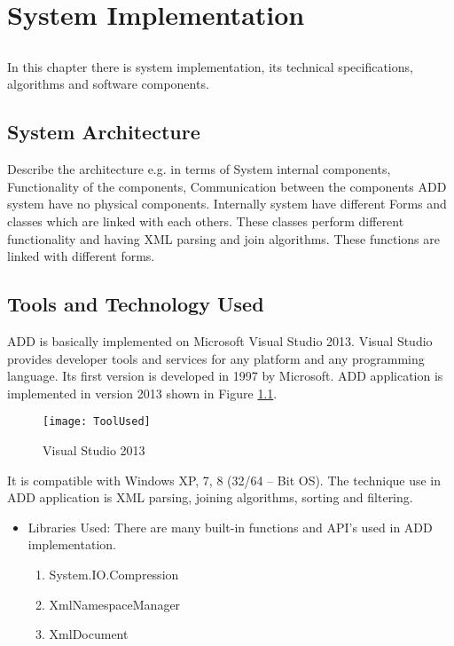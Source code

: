 \chapter{System Implementation} \label{chap:sysImplementation}

\section*{}
In this chapter there is system implementation, its technical specifications, algorithms and software components.

\section{System Architecture}
Describe the architecture e.g. in terms of System internal components, Functionality of the components, Communication between the components
ADD system have no physical components. Internally system have different Forms and classes which are linked with each others. These classes perform different functionality and having  XML parsing and join algorithms. These functions are linked with different forms.

\section{Tools and Technology Used}
ADD is basically implemented on Microsoft Visual Studio 2013. Visual Studio provides developer tools and services for any platform and any programming language. Its first version is developed in 1997 by Microsoft. ADD application is implemented in version 2013 shown in Figure \ref{fig:Visual Studio 2013}. 
\begin{figure}[ht]
\centering
\texttt{[image: ToolUsed]}
\caption{Visual Studio 2013}
\label{fig:Visual Studio 2013}
\end{figure} 
It is compatible with Windows XP, 7, 8 (32/64 – Bit OS). The technique use in ADD application is XML parsing, joining algorithms, sorting and filtering.
\begin{itemize}
	\item Libraries Used: There are many built-in functions and API's used in ADD implementation.
	
	\begin{enumerate}
		\item System.IO.Compression
		\item XmlNamespaceManager
		\item XmlDocument 
	\end{enumerate}
\end{itemize}
 

